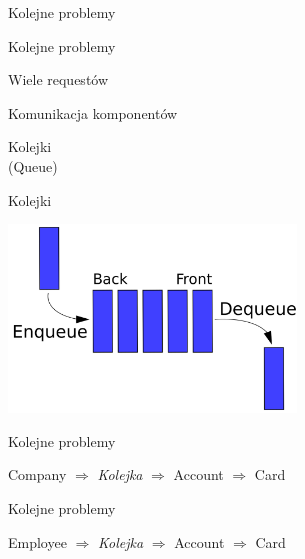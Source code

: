 \documentclass{beamer}
\begin{document}
\begin{frame}{}
	\begin{center}
		\Huge{Kolejne problemy}
	\end{center}
\end{frame}

\begin{frame}{Kolejne problemy}
	\begin{center}
		\Huge{Wiele requestów}
	\end{center}
\end{frame}

\begin{frame}{Komunikacja komponentów}
	\begin{center}
		\Huge{Kolejki}\\
		\huge{(Queue)}
	\end{center}
\end{frame}

\begin{frame}{Kolejki}
	\begin{center}
		\includegraphics[height=5cm]{queue1.png}
	\end{center}
\end{frame}

\begin{frame}{Kolejne problemy}
	\begin{center}
	\begin{huge}
			\item Company $\Rightarrow$ \textit{Kolejka} $\Rightarrow$ Account $\Rightarrow$ Card
	\end{huge}
	\end{center}
\end{frame}

\begin{frame}{Kolejne problemy}
	\begin{center}
	\begin{huge}
			\item Employee $\Rightarrow$ \textit{Kolejka} $\Rightarrow$ Account $\Rightarrow$ Card
	\end{huge}
	\end{center}
\end{frame}
\end{document}
